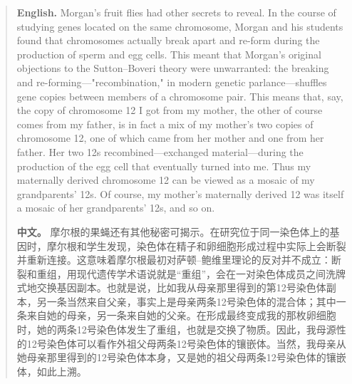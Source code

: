 \begin{quote}
\noindent\textbf{English.} Morgan's fruit flies had other secrets to reveal. In the course of studying genes located on the same chromosome, Morgan and his students found that chromosomes actually break apart and re-form during the production of sperm and egg cells. This meant that Morgan's original objections to the Sutton--Boveri theory were unwarranted: the breaking and re-forming---"recombination," in modern genetic parlance---shuffles gene copies between members of a chromosome pair. This means that, say, the copy of chromosome 12 I got from my mother, the other of course comes from my father, is in fact a mix of my mother's two copies of chromosome 12, one of which came from her mother and one from her father. Her two 12s recombined---exchanged material---during the production of the egg cell that eventually turned into me. Thus my maternally derived chromosome 12 can be viewed as a mosaic of my grandparents' 12s. Of course, my mother's maternally derived 12 was itself a mosaic of her grandparents' 12s, and so on.

\smallskip
\noindent\textbf{中文。} 摩尔根的果蝇还有其他秘密可揭示。在研究位于同一染色体上的基因时，摩尔根和学生发现，染色体在精子和卵细胞形成过程中实际上会断裂并重新连接。这意味着摩尔根最初对萨顿--鲍维里理论的反对并不成立：断裂和重组，用现代遗传学术语说就是“重组”，会在一对染色体成员之间洗牌式地交换基因副本。也就是说，比如我从母亲那里得到的第12号染色体副本，另一条当然来自父亲，事实上是母亲两条12号染色体的混合体；其中一条来自她的母亲，另一条来自她的父亲。在形成最终变成我的那枚卵细胞时，她的两条12号染色体发生了重组，也就是交换了物质。因此，我母源性的12号染色体可以看作外祖父母两条12号染色体的镶嵌体。当然，我母亲从她母亲那里得到的12号染色体本身，又是她的祖父母两条12号染色体的镶嵌体，如此上溯。
\end{quote}

